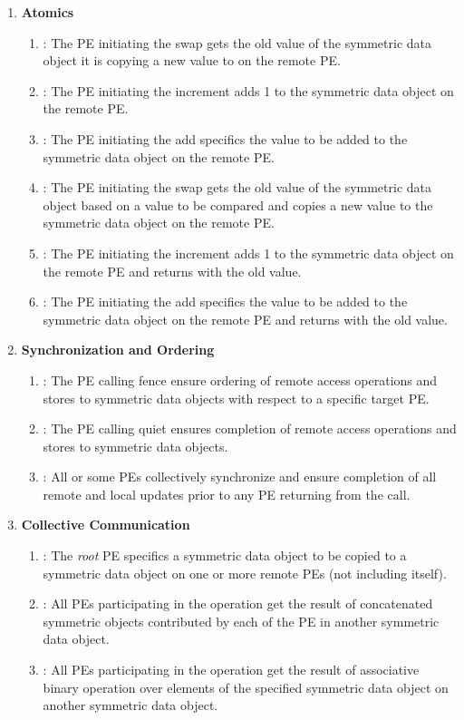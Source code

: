 \begin{enumerate}
\item \textbf{Atomics}
\begin{enumerate}
\item {}: The \ac{PE} initiating the swap gets the old value of the symmetric data object it is copying a new value to on the remote \ac{PE}.
\item {}: The \ac{PE} initiating the increment adds 1 to the symmetric data object on the remote \ac{PE}.
\item {}: The \ac{PE} initiating the add specifics the value to be added to the symmetric data object on the remote \ac{PE}.
\item {}: The \ac{PE} initiating the swap gets the old value of the symmetric data object based on a value to be compared and copies a new value to the symmetric data object on the remote \ac{PE}.
\item {}: The \ac{PE} initiating the increment adds 1 to the symmetric data object on the remote \ac{PE} and returns with the old value.
\item {}: The \ac{PE} initiating the add specifics the value to be added to the symmetric data object on the remote \ac{PE} and returns with the old value.
\end{enumerate}

\item \textbf{Synchronization and Ordering}
\begin{enumerate}
\item {}: The \ac{PE} calling fence ensure ordering of remote access operations and stores to symmetric data objects with respect to a specific target \ac{PE}. 
\item {}: The \ac{PE} calling quiet ensures completion of remote access operations and stores to symmetric data objects. 
\item {}: All or some \ac{PE}s collectively synchronize and ensure completion of all remote and local updates prior to any \ac{PE} returning from the call.
\end{enumerate}

\item \textbf{Collective Communication}
\begin{enumerate}
\item {}: The \textit{root} \ac{PE} specifics a symmetric data object to be copied to a symmetric data object on one or more remote \ac{PE}s (not including itself). 
\item {}: All \ac{PE}s participating in the operation get the result of concatenated symmetric objects contributed by each of the \ac{PE} in another symmetric data object.
\item {}: All \ac{PE}s participating in the operation get the result of associative binary operation over elements of the specified symmetric data object on another symmetric data object. 
\end{enumerate}


\end{enumerate}
